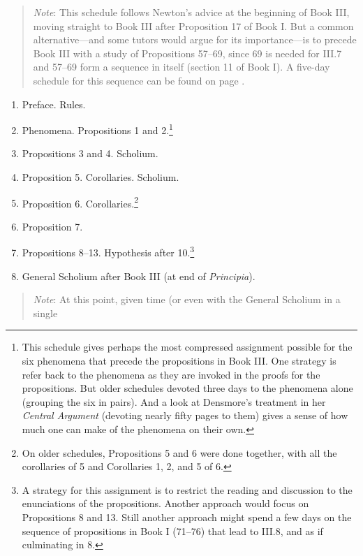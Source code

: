 \documentclass[10pt]{article}
\begin{document}
{\begin{enumerate}[resume*]
\end{enumerate} 
\begin{quote} \small{\emph{Note}: This
		schedule follows Newton's advice at the
		beginning of Book III, moving straight to
		Book III after Proposition 17 of Book I. But
		a common alternative---and some tutors would
		argue for its importance---is to precede
		Book III with a study of Propositions
		57--69, since 69 is needed for III.7 and
		57--69 form a sequence in itself (section 11
		of Book I). A five-day schedule for this
		sequence can be found on page
		\pageref{Newton}.} \end{quote}
\begin{enumerate}[resume*] \item Preface. Rules.  \item
		Phenomena. Propositions 1 and
		2.\footnote{This schedule gives perhaps the
			most compressed assignment possible
			for the six phenomena that precede
			the propositions in Book III. One
			strategy is refer back to the
			phenomena as they are invoked in the
			proofs for the propositions. But
			older schedules devoted three days
			to the phenomena alone (grouping the
			six in pairs). And a look at
			Densmore's treatment in her
			\emph{Central Argument} (devoting
			nearly fifty pages to them) gives a
			sense of how much one can make of
			the phenomena on their own.}
	\item Propositions 3 and 4. Scholium.
	\item Proposition 5. Corollaries. Scholium.
	\item Proposition 6. Corollaries.\footnote{On older
			schedules, Propositions 5 and 6 were done
			together, with all the corollaries
			of 5 and Corollaries 1, 2, and 5 of
			6.} 
	\item Proposition 7. 
	\item Propositions 8--13. Hypothesis after
		10.\footnote{A strategy for this assignment
			is to restrict the reading and
			discussion to the enunciations of the
			propositions. Another approach would
		focus on Propositions 8 and 13. Still
		another approach might spend a few days on
		the sequence of propositions in Book I
		(71--76) that lead to III.8, and as if culminating in 8.}
	\item General Scholium after Book III (at end of
		\emph{Principia}).
	\end{enumerate}
	\begin{quote}
		\small{\emph{Note}: At this point, given
			time (or even with the
			General Scholium in a single 
}
\end{quote}}
\end{document}
